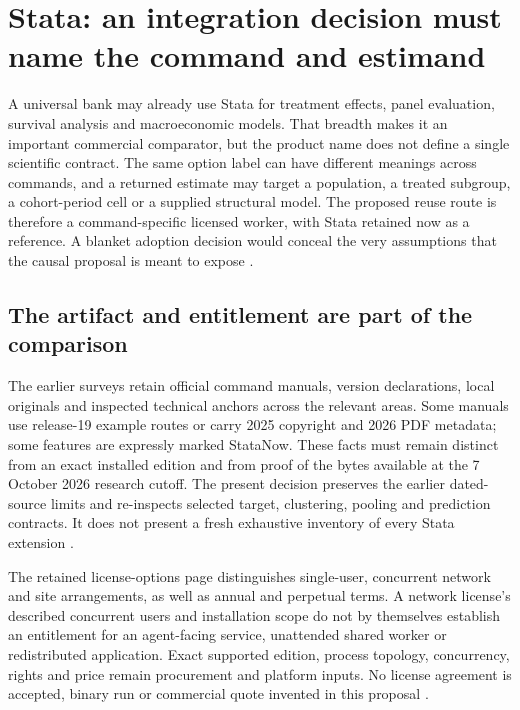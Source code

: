 \section{Stata: an integration decision must name the command and estimand}
\label{sec:exec24-stata-reuse}

A universal bank may already use Stata for treatment effects, panel
evaluation, survival analysis and macroeconomic models. That breadth makes
it an important commercial comparator, but the product name does not define
a single scientific contract. The same option label can have different
meanings across commands, and a returned estimate may target a population,
a treated subgroup, a cohort-period cell or a supplied structural model.
The proposed reuse route is therefore a command-specific licensed worker,
with Stata retained now as a reference. A blanket adoption decision would
conceal the very assumptions that the causal proposal is meant to expose
\citep{exec13_ci_stata_causal_intro,exec18_gp_stata_xthdid,
exec22_state_stata_sspace_post,exec24_stata_choice}.

\subsection{The artifact and entitlement are part of the comparison}
The earlier surveys retain official command manuals, version declarations,
local originals and inspected technical anchors across the relevant areas.
Some manuals use release-19 example routes or carry 2025 copyright and
2026 PDF metadata; some features are expressly marked StataNow. These
facts must remain distinct from an exact installed edition and from proof
of the bytes available at the 7 October 2026 research cutoff. The present
decision preserves the earlier dated-source limits and re-inspects selected
target, clustering, pooling and prediction contracts. It does not present
a fresh exhaustive inventory of every Stata extension
\citep{exec20_med_stata_multiple,exec18_gp_stata_post,exec24_stata_choice}.

The retained license-options page distinguishes single-user, concurrent
network and site arrangements, as well as annual and perpetual terms.
A network license's described concurrent users and installation scope do
not by themselves establish an entitlement for an agent-facing service,
unattended shared worker or redistributed application. Exact supported
edition, process topology, concurrency, rights and price remain procurement
and platform inputs. No license agreement is accepted, binary run or
commercial quote invented in this proposal \citep{exec13_ivrd_license,
exec24_stata_choice}.

